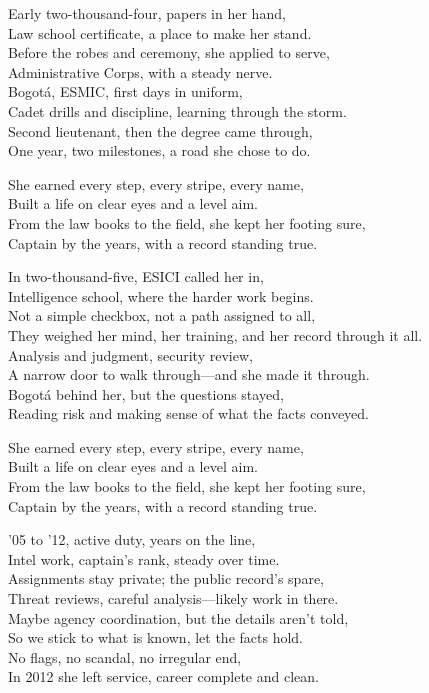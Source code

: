 \begin{lyrics}
Early two-thousand-four, papers in her hand,\\
Law school certificate, a place to make her stand.\\
Before the robes and ceremony, she applied to serve,\\
Administrative Corps, with a steady nerve.\\
Bogotá, ESMIC, first days in uniform,\\
Cadet drills and discipline, learning through the storm.\\
Second lieutenant, then the degree came through,\\
One year, two milestones, a road she chose to do.

She earned every step, every stripe, every name,\\
Built a life on clear eyes and a level aim.\\
From the law books to the field, she kept her footing sure,\\
Captain by the years, with a record standing true.

In two-thousand-five, ESICI called her in,\\
Intelligence school, where the harder work begins.\\
Not a simple checkbox, not a path assigned to all,\\
They weighed her mind, her training, and her record through it all.\\
Analysis and judgment, security review,\\
A narrow door to walk through—and she made it through.\\
Bogotá behind her, but the questions stayed,\\
Reading risk and making sense of what the facts conveyed.

She earned every step, every stripe, every name,\\
Built a life on clear eyes and a level aim.\\
From the law books to the field, she kept her footing sure,\\
Captain by the years, with a record standing true.

’05 to ’12, active duty, years on the line,\\
Intel work, captain’s rank, steady over time.\\
Assignments stay private; the public record’s spare,\\
Threat reviews, careful analysis—likely work in there.\\
Maybe agency coordination, but the details aren’t told,\\
So we stick to what is known, let the facts hold.\\
No flags, no scandal, no irregular end,\\
In 2012 she left service, career complete and clean.


\end{lyrics}
